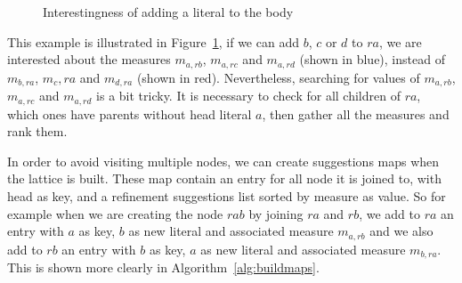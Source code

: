 \begin{figure}[!h]
  \caption{Interestingness of adding a literal to the body}
  \centering
  \label{fig:latticeSuggestion}
\end{figure}

This example is illustrated in Figure~\ref{fig:latticeSuggestion}, if we can add $b$, $c$ or $d$ to $ra$, we are
interested about the measures $m_{a,rb}$, $m_{a,rc}$ and $m_{a,rd}$ (shown in blue), instead of $m_{b,ra}$, $m_c,ra$ and
$m_{d,ra}$ (shown in red). Nevertheless, searching for values of $m_{a,rb}$, $m_{a,rc}$ and $m_{a,rd}$ is a bit tricky.
It is necessary to check for all children of $ra$, which ones have parents without head literal $a$, then gather all the
measures and rank them.

In order to avoid visiting multiple nodes, we can create suggestions maps when the lattice is built. These map
contain an entry for all node it is joined to, with head as key, and a refinement suggestions list sorted by
measure as value. So for example when we are creating the node $rab$ by joining $ra$ and $rb$, we add to $ra$ an entry
with $a$ as key, $b$ as new literal and  associated measure $m_{a,rb}$ and we also add to $rb$ an entry with $b$ as key,
$a$ as new literal and associated measure $m_{b,ra}$. This is shown more clearly in Algorithm~\ref{alg:buildmaps}.


